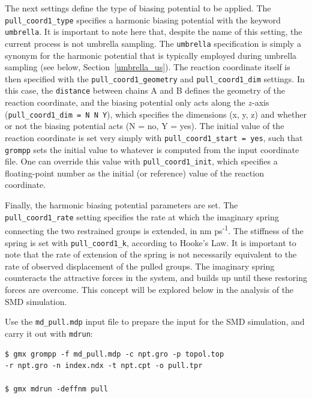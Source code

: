 \documentclass[9pt,tutorial]{livecoms}
\begin{document}
The next settings define the type of biasing potential to be applied. The \texttt{pull\_coord1\_type} specifies a harmonic biasing potential with the keyword \texttt{umbrella}. It is important to note here that, despite the name of this setting, the current process is not umbrella sampling. The \texttt{umbrella} specification is simply a synonym for the harmonic potential that is typically employed during umbrella sampling (see below, Section~\ref{umbrella_us}). The reaction coordinate itself is then specified with the \texttt{pull\_coord1\_geometry} and \texttt{pull\_coord1\_dim} settings. In this case, the \texttt{distance} between chains A and B defines the geometry of the reaction coordinate, and the biasing potential only acts along the $z$-axis (\texttt{pull\_coord1\_dim = N N Y}), which specifies the dimensions (x, y, z) and whether or not the biasing potential acts (N = no, Y = yes). The initial value of the reaction coordinate is set very simply with \texttt{pull\_coord1\_start = yes}, such that \texttt{grompp} sets the initial value to whatever is computed from the input coordinate file. One can override this value with \texttt{pull\_coord1\_init}, which specifies a floating-point number as the initial (or reference) value of the reaction coordinate.

Finally, the harmonic biasing potential parameters are set. The \texttt{pull\_coord1\_rate} setting specifies the rate at which the imaginary spring connecting the two restrained groups is extended, in nm ps\textsuperscript{-1}. The stiffness of the spring is set with \texttt{pull\_coord1\_k}, according to Hooke's Law. It is important to note that the rate of extension of the spring is not necessarily equivalent to the rate of observed displacement of the pulled groups. The imaginary spring counteracts the attractive forces in the system, and builds up until these restoring forces are overcome. This concept will be explored below in the analysis of the SMD simulation.

Use the \texttt{md\_pull.mdp} input file to prepare the input for the SMD simulation, and carry it out with \texttt{mdrun}:

\begin{verbatim}
$ gmx grompp -f md_pull.mdp -c npt.gro -p topol.top
-r npt.gro -n index.ndx -t npt.cpt -o pull.tpr

$ gmx mdrun -deffnm pull
\end{verbatim}
\end{document}
